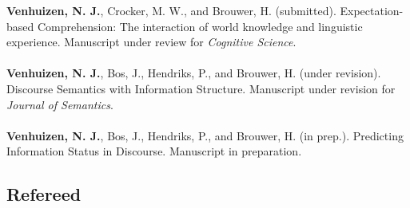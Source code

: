 \documentclass[a4paper,10pt]{article}
\begin{document}
\noindent
    \textbf{Venhuizen, N. J.}, Crocker, M. W., and Brouwer, H. (submitted).
    Expectation-based Comprehension: The interaction of world knowledge and
    linguistic experience. Manuscript under review for \textit{Cognitive Science}.\\
    \\
    \textbf{Venhuizen, N. J.}, Bos, J., Hendriks, P., and Brouwer, H.
    (under revision). Discourse Semantics with Information Structure.
    Manuscript under revision for \textit{Journal of Semantics}.\\
    \\
    \textbf{Venhuizen, N. J.}, Bos, J., Hendriks, P., and Brouwer, H. 
    (in prep.). Predicting Information Status in Discourse. Manuscript in
    preparation.

\subsection*{Refereed}
\end{document}
